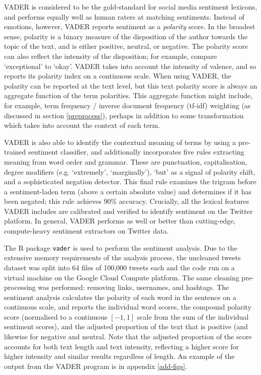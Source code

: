 \documentclass{article}
\begin{document}
VADER is considered to be the gold-standard for social media sentiment lexicons, and performs equally well as human raters at matching sentiments. Instead of emotions, however, VADER reports sentiment as a \textit{polarity} score. In the broadest sense, polarity is a binary measure of the disposition of the author towards the topic of the text, and is either positive, neutral, or negative. The polarity score can also reflect the intensity of the disposition; for example, compare `exceptional' to `okay'. VADER takes into account the intensity of valence, and so reports its polarity index on a continuous scale. When using VADER, the polarity can be reported at the text level, but this text polarity score is always an aggregate function of the term polarities. This aggregate function might include, for example, term frequency / inverse document frequency (tf-idf) weighting (as discussed in section \ref{preprocess}), perhaps in addition to some transformation which takes into account the context of each term.

VADER is also able to identify the contextual meaning of terms by using a pre-trained sentiment classifier, and additionally incorporates five rules extracting meaning from word order and grammar. These are punctuation, capitalisation, degree modifiers (e.g. `extremely', `marginally'), `but' as a signal of polarity shift, and a sophisticated negation detector. This final rule examines the trigram before a sentiment-laden term (above a certain absolute value) and determines if it has been negated; this rule achieves 90\% accuracy. Crucially, all the lexical features VADER includes are calibrated and verified to identify sentiment on the Twitter platform. In general, VADER performs as well or better than cutting-edge, compute-heavy sentiment extractors on Twitter data. 

The R package \texttt{vader} \parencite{roehrickVaderValenceAware2020} is used to perform the sentiment analysis. Due to the extensive memory requirements of the analysis process, the uncleaned tweets dataset was split into 64 files of 100,000 tweets each and the code run on a virtual machine on the Google Cloud Compute platform. The same cleaning pre-processing was performed: removing links, usernames, and hashtags. The sentiment analysis calculates the polarity of each word in the sentence on a continuous scale, and reports the  individual word scores, the compound polarity score (normalised to a continuous \([-1,1]\) scale from the sum of the individual sentiment scores), and the adjusted proportion of the text that is positive (and likewise for negative and neutral. Note that the adjusted proportion of the score accounts for both text length and text intensity, reflecting a higher score for higher intensity and similar results regardless of length. An example of the output from the VADER program is in appendix \ref{add-figs}.
\end{document}
